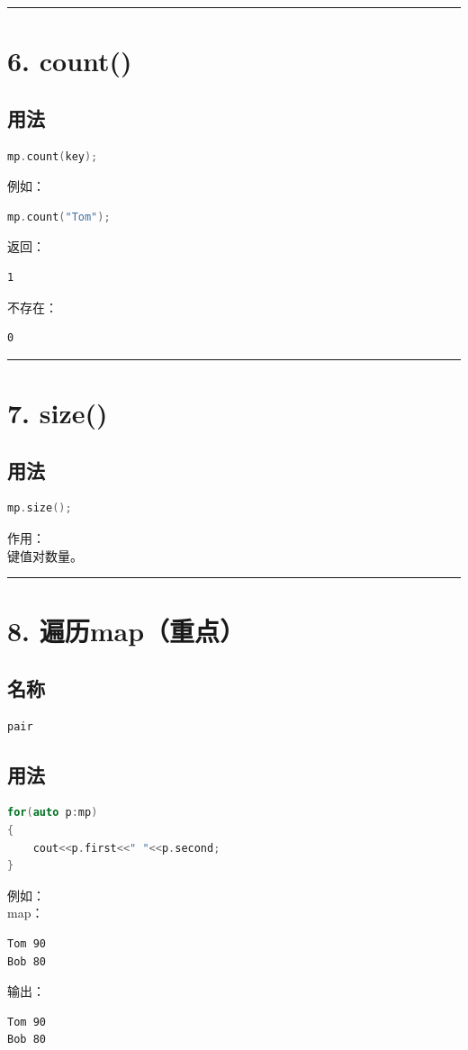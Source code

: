 \documentclass[10pt,twocolumn]{extarticle}
\begin{document}
\noindent\rule{\linewidth}{0.4pt}

\section{6. count()}

\subsection{用法}
\begin{lstlisting}[language=C++]
mp.count(key);
\end{lstlisting}
例如：
\begin{lstlisting}[language=C++]
mp.count("Tom");
\end{lstlisting}
返回：
\begin{lstlisting}
1
\end{lstlisting}
不存在：
\begin{lstlisting}
0
\end{lstlisting}

\noindent\rule{\linewidth}{0.4pt}

\section{7. size()}

\subsection{用法}
\begin{lstlisting}[language=C++]
mp.size();
\end{lstlisting}
作用：\\
键值对数量。

\noindent\rule{\linewidth}{0.4pt}

\section{8. 遍历map（重点）}

\subsection{名称}
\begin{lstlisting}[language=C++]
pair
\end{lstlisting}

\subsection{用法}
\begin{lstlisting}[language=C++]
for(auto p:mp)
{
    cout<<p.first<<" "<<p.second;
}
\end{lstlisting}
例如：\\
map：
\begin{lstlisting}
Tom 90
Bob 80
\end{lstlisting}
输出：
\begin{lstlisting}
Tom 90
Bob 80
\end{lstlisting}
\end{document}

